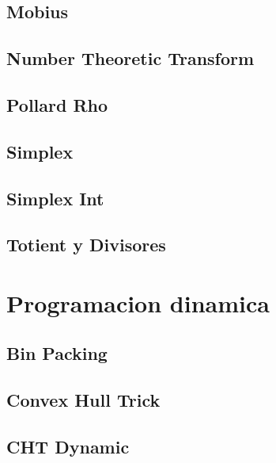 \subsection{Mobius}
\raggedbottom
\hrulefill
\subsection{Number Theoretic Transform}
\raggedbottom
\hrulefill
\subsection{Pollard	Rho}
\raggedbottom
\hrulefill
\subsection{Simplex}
\raggedbottom
\hrulefill
\subsection{Simplex Int}
\raggedbottom
\hrulefill
\subsection{Totient y Divisores}
\raggedbottom
\hrulefill

\section{Programacion dinamica}
\subsection{Bin Packing}
\raggedbottom
\hrulefill
\subsection{Convex Hull Trick}
\raggedbottom
\hrulefill
\subsection{CHT Dynamic}
\raggedbottom
\hrulefill
